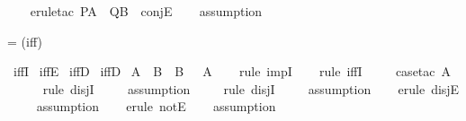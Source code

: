 \begin{isabellebody}
%
\isadelimproof
\ \ %
\endisadelimproof
%
\isatagproof
{}\isamarkupfalse%
\ {\isacharparenleft}{\kern0pt}erule{\isacharunderscore}{\kern0pt}tac\ {\isacharquery}{\kern0pt}P{\isacharequal}{\kern0pt}A\ \ {\isacharquery}{\kern0pt}Q{\isacharequal}{\kern0pt}B\ \ conjE{\isacharparenright}{\kern0pt}\isanewline
\ \ \isamarkupfalse%
\ assumption\isanewline
\ \ \isamarkupfalse%
%
\endisatagproof
{\isafoldproof}%
%
\isadelimproof
%
\endisadelimproof
%
\begin{isamarkuptext}%
= (iff)%
\end{isamarkuptext}\isamarkuptrue%
\isamarkupfalse%
\ iffI\isanewline
{}\isamarkupfalse%
\ iffE\isanewline
{}\isamarkupfalse%
\ iffD{}\isanewline
{}\isamarkupfalse%
\ iffD{}\isanewline
\isanewline
{}\isamarkupfalse%
\ {\isachardoublequoteopen}A\ {\isasymlongrightarrow}\ B\ {\isacharequal}{\kern0pt}\ {\isacharparenleft}{\kern0pt}B\ {\isasymor}\ {\isasymnot}\ A{\isacharparenright}{\kern0pt}{\isachardoublequoteclose}\isanewline
%
\isadelimproof
\ \ %
\endisadelimproof
%
\isatagproof
{}\isamarkupfalse%
\ {\isacharparenleft}{\kern0pt}rule\ impI{\isacharparenright}{\kern0pt}\isanewline
\ \ \isamarkupfalse%
\ {\isacharparenleft}{\kern0pt}rule\ iffI{\isacharparenright}{\kern0pt}\isanewline
\ \ \ \isamarkupfalse%
\ {\isacharparenleft}{\kern0pt}case{\isacharunderscore}{\kern0pt}tac\ A{\isacharparenright}{\kern0pt}\isanewline
\ \ \ \ \isamarkupfalse%
\ {\isacharparenleft}{\kern0pt}rule\ disjI{}{\isacharparenright}{\kern0pt}\isanewline
\ \ \ \isamarkupfalse%
\ {\isacharparenleft}{\kern0pt}assumption{\isacharparenright}{\kern0pt}\isanewline
\ \ \ \isamarkupfalse%
\ {\isacharparenleft}{\kern0pt}rule\ disjI{}{\isacharparenright}{\kern0pt}\isanewline
\ \ \ \isamarkupfalse%
\ {\isacharparenleft}{\kern0pt}assumption{\isacharparenright}{\kern0pt}\isanewline
\ \ \isamarkupfalse%
\ {\isacharparenleft}{\kern0pt}erule\ disjE{\isacharparenright}{\kern0pt}\isanewline
\ \ \ \isamarkupfalse%
\ assumption\isanewline
\ \ \isamarkupfalse%
\ {\isacharparenleft}{\kern0pt}erule\ notE{\isacharparenright}{\kern0pt}\isanewline
\ \ \isamarkupfalse%
\ assumption\isanewline
\ \ \isamarkupfalse%
\isanewline
\isanewline
%
\end{isabellebody}
